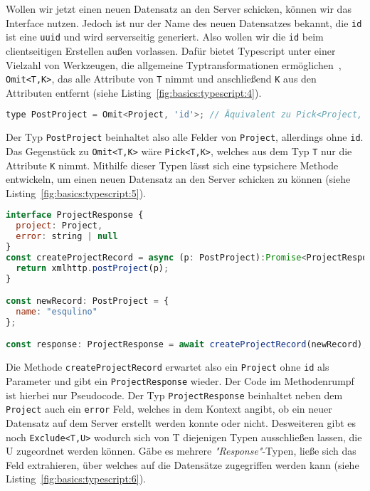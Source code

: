 Wollen wir jetzt einen neuen Datensatz an den Server schicken, können wir das Interface nutzen. Jedoch ist nur der Name des neuen Datensatzes bekannt,
die \texttt{id} ist eine \texttt{uuid} und wird serverseitig generiert. Also wollen wir die \texttt{id} beim clientseitigen Erstellen außen vorlassen.
Dafür bietet Typescript unter einer Vielzahl von Werkzeugen, die allgemeine Typtransformationen ermöglichen~\cite{typescript-utility-types},
\texttt{Omit<T,K>}, das alle Attribute von \texttt{T} nimmt und anschließend \texttt{K} aus den Attributen entfernt  (siehe Listing~\ref{fig:basics:typescript:4}).

\begin{lstlisting}[language=Javascript,float=h!,caption={Transformierter \texttt{Project} Typ}, label={fig:basics:typescript:4}]
type PostProject = Omit<Project, 'id'>; // Äquivalent zu Pick<Project, 'name'>
\end{lstlisting}

Der Typ \texttt{PostProject} beinhaltet also alle Felder von \texttt{Project}, allerdings ohne \texttt{id}. Das Gegenstück zu \texttt{Omit<T,K>} wäre \texttt{Pick<T,K>},
welches aus dem Typ \texttt{T} nur die Attribute \texttt{K} nimmt. Mithilfe dieser Typen lässt sich eine typsichere Methode entwickeln,
um einen neuen Datensatz an den Server schicken zu können (siehe Listing~\ref{fig:basics:typescript:5}).
\begin{lstlisting}[language=Javascript,float=h!,caption={Typen und Methode zum Abschicken eines \texttt{Project}-Datensatzes}, label={fig:basics:typescript:5}]
interface ProjectResponse {
  project: Project,
  error: string | null
}
const createProjectRecord = async (p: PostProject):Promise<ProjectResponse> => {
  return xmlhttp.postProject(p);
}

const newRecord: PostProject = {
  name: "esqulino"
};

const response: ProjectResponse = await createProjectRecord(newRecord);
\end{lstlisting}

Die Methode \texttt{createProjectRecord} erwartet also ein \texttt{Project} ohne \texttt{id} als Parameter und gibt ein \texttt{ProjectResponse} wieder.
Der Code im Methodenrumpf ist hierbei nur Pseudocode. Der Typ \texttt{ProjectResponse} beinhaltet neben dem \texttt{Project} auch ein \texttt{error} Feld,
welches in dem Kontext angibt, ob ein neuer Datensatz auf dem Server erstellt werden konnte oder nicht.
Desweiteren gibt es noch \texttt{Exclude<T,U>} wodurch sich von T diejenigen Typen ausschließen lassen,
die U zugeordnet werden können. Gäbe es mehrere \emph{"Response"}-Typen, ließe sich das Feld extrahieren,
über welches auf die Datensätze zugegriffen werden kann (siehe Listing~\ref{fig:basics:typescript:6}).

